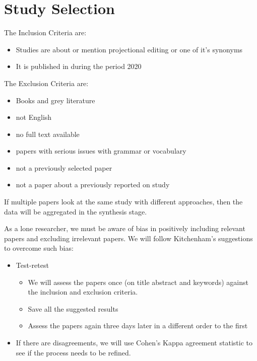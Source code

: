 \section{Study Selection}

The Inclusion Criteria are:
\begin{itemize}
       \item Studies are about or mention projectional editing or one of it's synonyms
       \item It is published in during the period 2020
\end{itemize}

The Exclusion Criteria are:
\begin{itemize}
       \item Books and grey literature
       \item not English
       \item no full text available
       \item papers with serious issues with grammar or vocabulary
       \item not a previously selected paper
       \item not a paper about a previously reported on study
\end{itemize}

If multiple papers look at the same study with different approaches, then the data will be aggregated in the synthesis stage.

As a lone researcher, we must be aware of bias in positively including relevant papers and excluding irrelevant papers.  
We will follow Kitchenham's suggestions to overcome such bias:
\begin{itemize}
       \item Test-retest 
       \begin{itemize}
              \item We will assess the papers once (on title abstract and keywords) against the inclusion and exclusion criteria.
              \item Save all the suggested results
              \item Assess the papers again three days later in a different order to the first  
       \end{itemize}
       \item If there are disagreements, we will use Cohen's Kappa agreement statistic \cite{Cohen_1960} to see if the process needs to be refined.
\end{itemize} 

